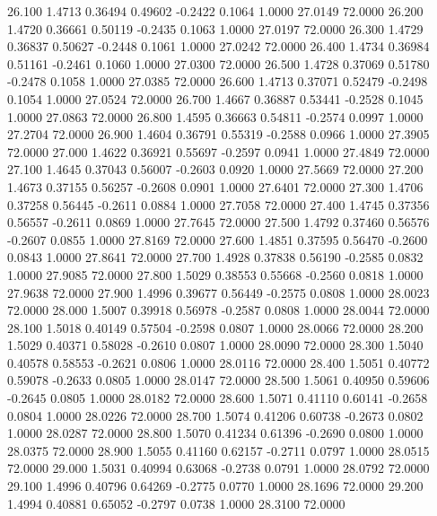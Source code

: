   26.100   1.4713   0.36494   0.49602  -0.2422   0.1064   1.0000  27.0149  72.0000
  26.200   1.4720   0.36661   0.50119  -0.2435   0.1063   1.0000  27.0197  72.0000
  26.300   1.4729   0.36837   0.50627  -0.2448   0.1061   1.0000  27.0242  72.0000
  26.400   1.4734   0.36984   0.51161  -0.2461   0.1060   1.0000  27.0300  72.0000
  26.500   1.4728   0.37069   0.51780  -0.2478   0.1058   1.0000  27.0385  72.0000
  26.600   1.4713   0.37071   0.52479  -0.2498   0.1054   1.0000  27.0524  72.0000
  26.700   1.4667   0.36887   0.53441  -0.2528   0.1045   1.0000  27.0863  72.0000
  26.800   1.4595   0.36663   0.54811  -0.2574   0.0997   1.0000  27.2704  72.0000
  26.900   1.4604   0.36791   0.55319  -0.2588   0.0966   1.0000  27.3905  72.0000
  27.000   1.4622   0.36921   0.55697  -0.2597   0.0941   1.0000  27.4849  72.0000
  27.100   1.4645   0.37043   0.56007  -0.2603   0.0920   1.0000  27.5669  72.0000
  27.200   1.4673   0.37155   0.56257  -0.2608   0.0901   1.0000  27.6401  72.0000
  27.300   1.4706   0.37258   0.56445  -0.2611   0.0884   1.0000  27.7058  72.0000
  27.400   1.4745   0.37356   0.56557  -0.2611   0.0869   1.0000  27.7645  72.0000
  27.500   1.4792   0.37460   0.56576  -0.2607   0.0855   1.0000  27.8169  72.0000
  27.600   1.4851   0.37595   0.56470  -0.2600   0.0843   1.0000  27.8641  72.0000
  27.700   1.4928   0.37838   0.56190  -0.2585   0.0832   1.0000  27.9085  72.0000
  27.800   1.5029   0.38553   0.55668  -0.2560   0.0818   1.0000  27.9638  72.0000
  27.900   1.4996   0.39677   0.56449  -0.2575   0.0808   1.0000  28.0023  72.0000
  28.000   1.5007   0.39918   0.56978  -0.2587   0.0808   1.0000  28.0044  72.0000
  28.100   1.5018   0.40149   0.57504  -0.2598   0.0807   1.0000  28.0066  72.0000
  28.200   1.5029   0.40371   0.58028  -0.2610   0.0807   1.0000  28.0090  72.0000
  28.300   1.5040   0.40578   0.58553  -0.2621   0.0806   1.0000  28.0116  72.0000
  28.400   1.5051   0.40772   0.59078  -0.2633   0.0805   1.0000  28.0147  72.0000
  28.500   1.5061   0.40950   0.59606  -0.2645   0.0805   1.0000  28.0182  72.0000
  28.600   1.5071   0.41110   0.60141  -0.2658   0.0804   1.0000  28.0226  72.0000
  28.700   1.5074   0.41206   0.60738  -0.2673   0.0802   1.0000  28.0287  72.0000
  28.800   1.5070   0.41234   0.61396  -0.2690   0.0800   1.0000  28.0375  72.0000
  28.900   1.5055   0.41160   0.62157  -0.2711   0.0797   1.0000  28.0515  72.0000
  29.000   1.5031   0.40994   0.63068  -0.2738   0.0791   1.0000  28.0792  72.0000
  29.100   1.4996   0.40796   0.64269  -0.2775   0.0770   1.0000  28.1696  72.0000
  29.200   1.4994   0.40881   0.65052  -0.2797   0.0738   1.0000  28.3100  72.0000
